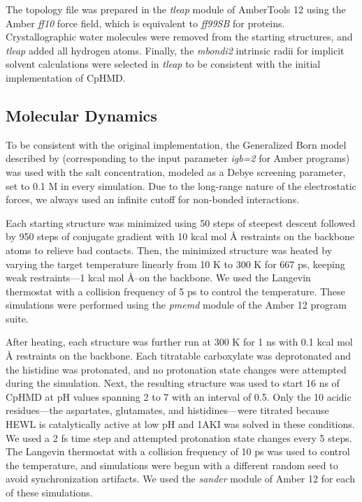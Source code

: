 The topology file was prepared in the \emph{tleap} module of AmberTools 12 using
the Amber \emph{ff10} force field, which is equivalent to \emph{ff99SB}
\cite{Hornak_Proteins_2006_v65_p712} for proteins. Crystallographic water
molecules were removed from the starting structures, and \emph{tleap} added all
hydrogen atoms.  Finally, the \emph{mbondi2} intrinsic radii for implicit
solvent calculations were selected in \emph{tleap} to be consistent with the
initial implementation of CpHMD. \cite{Mongan_JComputChem_2004_v25_p2038}

\subsection{Molecular Dynamics}

To be consistent with the original implementation, the Generalized Born model
described by \citeauthor{Onufriev_Proteins_2004_v55_p383}
\cite{Onufriev_Proteins_2004_v55_p383} (corresponding to the input parameter
\emph{igb=2} for Amber programs) was used with the salt concentration, modeled
as a Debye screening parameter, set to 0.1 M in every simulation.
\cite{Mongan_JComputChem_2004_v25_p2038} Due to the long-range nature of the
electrostatic forces, we always used an infinite cutoff for non-bonded
interactions.

Each starting structure was minimized using 50 steps of steepest descent
followed by 950 steps of conjugate gradient with 10 kcal mol
\AA{} restraints on the backbone atoms to relieve bad contacts. Then,
the minimized structure was heated by varying the target temperature linearly
from 10 K to 300 K for 667 ps, keeping weak restraints---1 kcal mol
\AA{}--on the backbone. We used the Langevin thermostat with a
collision frequency of 5 ps to control the temperature. These
simulations were performed using the \emph{pmemd} module of the Amber 12 program
suite. \cite{AMBER12}

After heating, each structure was further run at 300 K for 1 ns with 0.1 kcal
mol \AA{} restraints on the backbone. Each titratable
carboxylate was deprotonated and the histidine was protonated, and no
protonation state changes were attempted during the simulation. Next, the
resulting structure was used to start 16 ns of CpHMD at pH values spanning 2 to
7 with an interval of 0.5. Only the 10 acidic residues---the aspartates,
glutamates, and histidines---were titrated because HEWL is catalytically active
at low pH \cite{Vocadlo_Nature_2001_v412_p835} and 1AKI was solved in these
conditions. We used a 2 fs time step and attempted protonation state changes
every 5 steps. The Langevin thermostat with a collision frequency of 10
ps was used to control the temperature, and simulations were begun
with a different random seed to avoid synchronization artifacts.
\cite{Sindhikara_JChemTheoryComput_2009_v5_p1624} We used the \emph{sander}
module of Amber 12 for each of these simulations.

